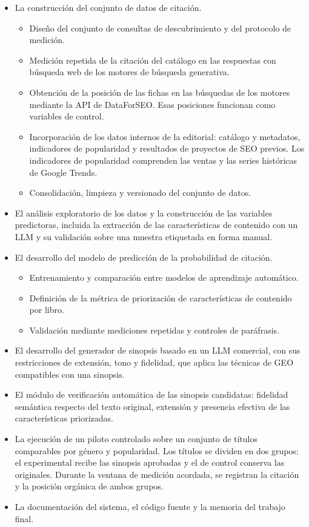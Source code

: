 \documentclass[
11pt, %
codirector, %
]{charter}
\begin{document}
\begin{itemize}
	\item La construcción del conjunto de datos de citación.
		\begin{itemize}
		\item Diseño del conjunto de consultas de descubrimiento y del protocolo de medición.
		\item Medición repetida de la citación del catálogo en las respuestas con búsqueda web de los motores de búsqueda generativa.
		\item Obtención de la posición de las fichas en las búsquedas de los motores mediante la API de DataForSEO. Esas posiciones funcionan como variables de control.
		\item Incorporación de los datos internos de la editorial: catálogo y metadatos, indicadores de popularidad y resultados de proyectos de SEO previos. Los indicadores de popularidad comprenden las ventas y las series históricas de Google Trends.
		\item Consolidación, limpieza y versionado del conjunto de datos.
		\end{itemize}
	\item El análisis exploratorio de los datos y la construcción de las variables predictoras, incluida la extracción de las características de contenido con un LLM y su validación sobre una muestra etiquetada en forma manual.
	\item El desarrollo del modelo de predicción de la probabilidad de citación.
		\begin{itemize}
		\item Entrenamiento y comparación entre modelos de aprendizaje automático.
		\item Definición de la métrica de priorización de características de contenido por libro.
		\item Validación mediante mediciones repetidas y controles de paráfrasis.
		\end{itemize}
	\item El desarrollo del generador de sinopsis basado en un LLM comercial, con sus restricciones de extensión, tono y fidelidad, que aplica las técnicas de GEO compatibles con una sinopsis.
	\item El módulo de verificación automática de las sinopsis candidatas: fidelidad semántica respecto del texto original, extensión y presencia efectiva de las características priorizadas.
	\item La ejecución de un piloto controlado sobre un conjunto de títulos comparables por género y popularidad. Los títulos se dividen en dos grupos: el experimental recibe las sinopsis aprobadas y el de control conserva las originales. Durante la ventana de medición acordada, se registran la citación y la posición orgánica de ambos grupos.
	\item La documentación del sistema, el código fuente y la memoria del trabajo final.
\end{itemize}
\end{document}

